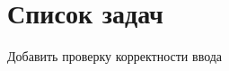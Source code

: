 \chapter{Список задач}
\hypertarget{todo}{}\label{todo}

\begin{DoxyRefList}
\item[page \doxylink{index}{Навигация робота с запретными зонами} ]\label{todo__todo000001}%
%
Добавить проверку корректности ввода
\end{DoxyRefList}